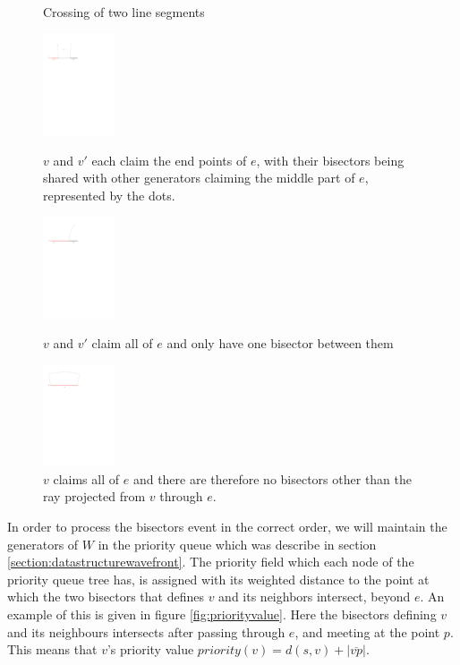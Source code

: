\begin{figure}[H]
	\caption{Crossing of two line segments}
		\includegraphics[height=3cm]{figures/vandvprimesharingedge.pdf}
		\caption{$v$ and $v'$ each claim the end points of $e$, with their bisectors being shared with other generators claiming the middle part of $e$, represented by the dots.}
		\label{fig:vandvprimesharingedge}
	\endminipage\hfill
		\includegraphics[height=3cm]{figures/vandvprimeallofe.pdf}
		\caption{$v$ and $v'$ claim all of $e$ and only have one bisector between them}
		\label{fig:vandvprimeallofe}
	\endminipage\hfill
	\centering
		\includegraphics[height=3cm]{figures/visallofe.pdf}
		\caption{$v$ claims all of $e$ and there are therefore no bisectors other than the ray projected from $v$ through $e$.}
		\label{fig:visallofe}
		\endminipage\hfill
\end{figure}

In order to process the bisectors event in the correct order, we will maintain the generators of $W$ in the priority queue which was 
describe in section \ref{section:datastructurewavefront}. The priority field which each node of the priority queue tree has, is 
assigned with its weighted distance to the point at which the two bisectors that defines $v$ and its neighbors intersect, beyond $e$. 
An example of this is given in figure \ref{fig:priorityvalue}. Here the bisectors defining $v$ and its neighbours intersects after 
passing through $e$, and meeting at the point $p$. This means that $v$'s priority value $priority(v) = d(s,v) + |\overline{vp}|$.

